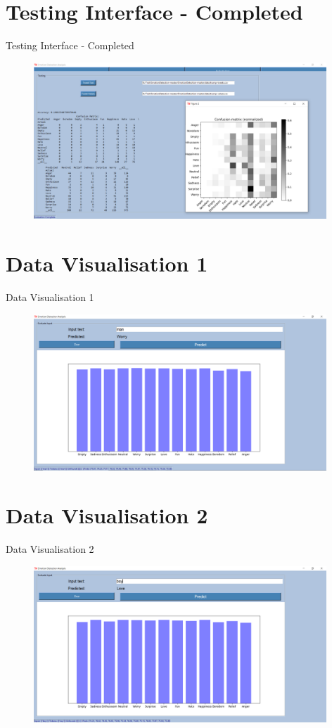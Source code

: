 \documentclass{beamer}
\begin{document}
\section{Testing Interface - Completed}
\begin{frame}{Testing Interface - Completed}
\begin{figure}[H]
\centering
\includegraphics[width=110mm]{TestingGUI-Complete.png}
\end{figure}
\end{frame}

\section{Data Visualisation 1}
\begin{frame}{Data Visualisation 1}
\begin{figure}[H]
\centering
\includegraphics[width=110mm]{DV1.png}
\end{figure}
\end{frame}

\section{Data Visualisation 2}
\begin{frame}{Data Visualisation 2}
\begin{figure}[H]
\centering
\includegraphics[width=110mm]{DV2.png}
\end{figure}
\end{frame}
\end{document}
